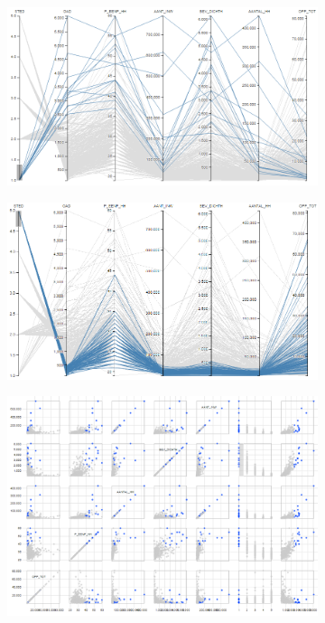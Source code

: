 \begin{figure}[h!]
    \centering
    \captionsetup{justification=centering,margin=0.5cm}
    \begin{subfigure}[t]{0.48\textwidth}
        \includegraphics[width=\textwidth]{img/pcp_STED1.png}
        \caption{ }
    \end{subfigure}
    \begin{subfigure}[t]{0.48\textwidth}
        \includegraphics[width=\textwidth]{img/pcp_STED5.png}
        \caption{ }
    \end{subfigure}
    \begin{subfigure}[t]{0.48\textwidth}
        \includegraphics[width=\textwidth]{img/sm_STED1.png}

\end{subfigure}
\end{figure}
